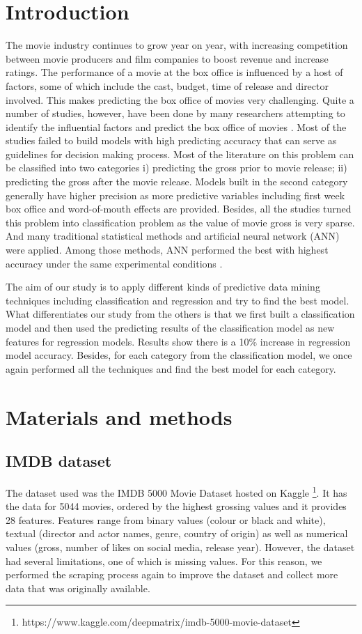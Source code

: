 \section{Introduction}
The movie industry continues to grow year on year, with increasing competition between movie producers and film companies to boost revenue and increase ratings. The performance of a movie at the box office is influenced by a host of factors, some of which include the cast, budget, time of release and director involved. This makes predicting the box office of movies very challenging. Quite a number of studies, however, have been done by many researchers attempting to identify the influential factors and predict the box office of movies \cite{sharda2006predicting}. Most of the studies failed to build models with high predicting accuracy that can serve as guidelines for decision making process. Most of the literature on this problem can be classified into two categories i) predicting the gross prior to movie release; ii) predicting the gross after the movie release. Models built in the second category generally have higher precision as more predictive variables including first week box office and word-of-mouth effects are provided. Besides, all the studies turned this problem into classification problem as the value of movie gross is very sparse.  And many traditional statistical methods and artificial neural network (ANN) were applied. Among those methods, ANN performed the best with highest accuracy under the same experimental conditions \cite{sharda2006predicting}.
 
The aim of our study is to apply different kinds of predictive data mining techniques including classification and regression and try to find the best model. What differentiates our study from the others is that we first built a classification model and then used the predicting results of the classification model as new features for regression models. Results show there is a 10\% increase in regression model accuracy. Besides, for each category from the classification model, we once again performed all the techniques and find the best model for each category.


\section{Materials and methods}

\subsection{IMDB dataset}
The dataset used was the IMDB 5000 Movie Dataset hosted on Kaggle \footnote{https://www.kaggle.com/deepmatrix/imdb-5000-movie-dataset}. It has the data for 5044 movies, ordered by the highest grossing values and it provides 28 features. Features range from binary values (colour or black and white), textual (director and actor names, genre, country of origin) as well as numerical values (gross, number of likes on social media, release year).  However, the dataset had several limitations, one of which is missing values. For this reason, we performed the scraping process again to improve the dataset and collect more data that was originally available.

